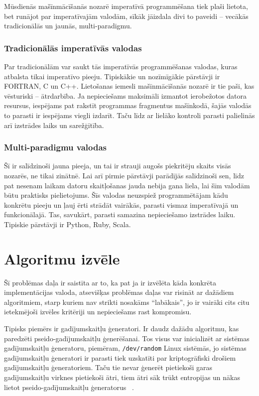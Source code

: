 \documentclass{ludis}
\begin{document}
Mūsdienās mašīnmācīšanās nozarē imperatīvā programmēšana tiek plaši lietota, bet runājot par imperatīvajām valodām, sīkāk jāizdala divi to paveidi -- vecākās tradicionālās un jaunās, multi-paradigmu.

\subsubsection{Tradicionālās imperatīvās valodas}
Par tradicionālām var saukt tās imperatīvās programmēšanas valodas, kuras atbalsta tikai imperatīvo pieeju. Tipiskākie un nozīmīgākie pārstāvji ir FORTRAN, C un C++. Lietošanas iemesli mašīnmācīšanās nozarē ir tie paši, kas vēsturiski -- ātrdarbība. Ja nepieciešams maksimāli izmantot ierobežotos datora resursus, iespējams pat rakstīt programmas fragmentus mašīnkodā, šajās valodās to parasti ir iespējams viegli izdarīt. Taču līdz ar lielāko kontroli parasti palielinās arī izstrādes laiks un sarežģītība.

\subsubsection{Multi-paradigmu valodas}  \label{sec:multi_paradigm}
Šī ir salīdzinoši jauna pieeja, un tai ir strauji augošs piekritēju skaits visās nozarēs, ne tikai zinātnē. Lai arī pirmie pārstāvji parādījās salīdzinoši sen, līdz pat nesenam laikam datoru skaitļošanas jauda nebija gana liela, lai šīm valodām būtu praktisks pielietojums. Šīs valodas neuzspiež programmētājam kādu konkrētu pieeju un ļauj ērti strādāt vairākās, parasti vismaz imperatīvajā un funkcionālajā. Tas, savukārt, parasti samazina nepieciešamo izstrādes laiku. Tipiskie pārstāvji ir Python, Ruby, Scala.

\section{Algoritmu izvēle}
Šī problēmas daļa ir saistīta ar to, ka pat ja ir izvēlēta kāda konkrēta implementācijas valoda, atsevišķas problēmas daļas var risināt ar dažādiem algoritmiem, starp kuriem nav strikti nosakāms ``labākais'', jo ir vairāki cits citu ietekmējoši izvēles kritēriji un nepieciešams rast kompromisu. 

Tipisks piemērs ir gadījumskaitļu ģeneratori. Ir daudz dažādu algoritmu, kas paredzēti pseido-gadījumskaitļu ģenerēšanai. Tos visus var inicializēt ar sistēmas gadījumskaitļu ģeneratoru, piemēram, \texttt{/dev/random} Linux sistēmās, jo sistēmas gadījumskaitļu ģeneratori ir parasti tiek uzskatīti par kriptogrāfiski drošiem gadījumskaitļu ģeneratoriem. Taču tie nevar ģenerēt pietiekoši garas gadījumskaitļu virknes pietiekoši ātri, tiem ātri sāk trūkt entropijas un nākas lietot pseido-gadījumskaitļu ģeneratorus ~\cite{man_random}.
\end{document}
